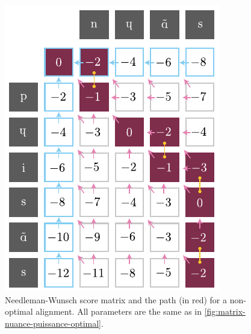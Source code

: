 \begin{figure}[H]
    \centering
    \includegraphics[width=0.77\linewidth]{assets/illustrator/matrix-nuance-puissance-non-optimal.pdf}
    \caption{Needleman-Wunsch score matrix and the path (in red) for a non-optimal alignment. All parameters are the same as in \autoref{fig:matrix-nuance-puissance-optimal}.}
    \label{fig:matrix-nuance-puissance-non-optimal}
\end{figure}
